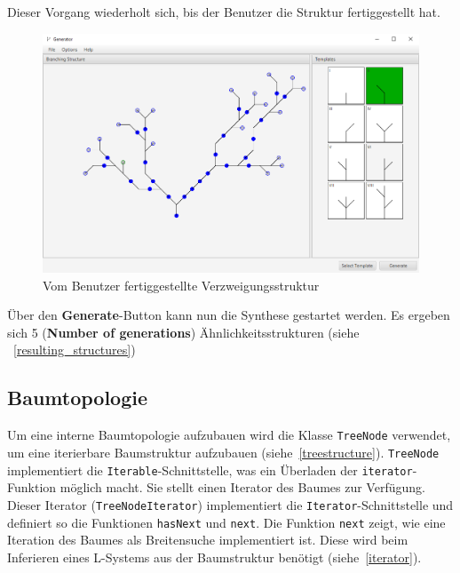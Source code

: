 Dieser Vorgang wiederholt sich, bis der Benutzer die Struktur fertiggestellt hat.
\begin{figure}[H]
    \centering
    \includegraphics[width=13cm]{../images/UI_finished.png}
    \caption{Vom Benutzer fertiggestellte Verzweigungsstruktur}
\end{figure}

Über den \textbf{Generate}-Button kann nun die Synthese gestartet werden.
Es ergeben sich 5 (\textbf{Number of generations}) Ähnlichkeitsstrukturen
(siehe ~\ref{resulting_structures})

\subsection*{Baumtopologie}
Um eine interne Baumtopologie aufzubauen wird die Klasse \texttt{TreeNode} verwendet, um eine iterierbare Baumstruktur
aufzubauen (siehe~\ref{treestructure}).
\texttt{TreeNode} implementiert die \texttt{Iterable}-Schnittstelle, was ein Überladen der \texttt{iterator}-Funktion möglich
macht.
Sie stellt einen Iterator des Baumes zur Verfügung.
Dieser Iterator (\texttt{TreeNodeIterator}) implementiert die \texttt{Iterator}-Schnittstelle und definiert so die Funktionen
\texttt{hasNext} und \texttt{next}.
Die Funktion \texttt{next} zeigt, wie eine Iteration des Baumes als Breitensuche implementiert ist.
Diese wird beim Inferieren eines L-Systems aus der Baumstruktur benötigt (siehe~\ref{iterator}).

\newpage

